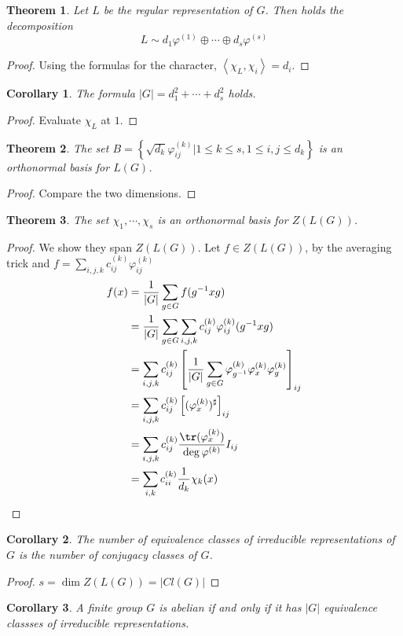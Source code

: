 \documentclass{article}
\newtheorem{Thm}{Theorem}[section]
\newtheorem{corollary}{Corollary}[Thm]
\theoremstyle{definition}
\begin{document}
\begin{Thm}
    Let $L$ be the regular representation of $G$. Then holds the decomposition
    \[L\sim d_1\varphi^{(1)}\oplus\cdots\oplus d_s\varphi^{(s)}\]
\end{Thm}
\begin{proof}
    Using the formulas for the character, $\left\langle\chi_L,\chi_i\right\rangle=d_i$.
\end{proof}
\begin{corollary}
    The formula $\left|G\right|=d_1^2+\cdots+d_s^2$ holds.
\end{corollary}
\begin{proof}
    Evaluate $\chi_L$ at $1$.
\end{proof}

\begin{Thm}
    The set $B=\left\{\sqrt{d_k}\varphi_{ij}^{(k)}|1\le k\le s,1\le i,j\le d_k\right\}$ is an orthonormal basis for $L(G)$.
\end{Thm}
\begin{proof}
    Compare the two dimensions.
\end{proof}

\begin{Thm}
    The set $\chi_1,\cdots,\chi_s$ is an orthonormal basis for $Z(L(G))$.
\end{Thm}
\begin{proof}
    We show they span $Z(L(G))$. Let $f\in Z(L(G))$, by the averaging trick and $f=\sum_{i,j,k}c_{ij}^{(k)}\varphi_{ij}^{(k)}$
    \begin{align*}
        f(x)&=\frac{1}{\left|G\right|}\sum_{g\in G}f(g^{-1}xg)\\
        &=\frac{1}{\left|G\right|}\sum_{g\in G}\sum_{i,j,k}c_{ij}^{(k)}\varphi_{ij}^{(k)}(g^{-1}xg)\\
        &=\sum_{i,j,k}c_{ij}^{(k)}\left[\frac{1}{\left|G\right|}\sum_{g\in G}\varphi^{(k)}_{g^{-1}}\varphi^{(k)}_x\varphi^{(k)}_g\right]_{ij}\\
        &=\sum_{i,j,k}c_{ij}^{(k)}\left[(\varphi_x^{(k)})^\sharp\right]_{ij}\\
        &=\sum_{i,j,k}c_{ij}^{(k)}\frac{\tr(\varphi_x^{(k)})}{\deg \varphi^{(k)}}I_{ij}\\
        &=\sum_{i,k}c_{ii}^{(k)}\frac{1}{d_k}\chi_k(x)
    \end{align*}
\end{proof}
\begin{corollary}
    The number of equivalence classes of irreducible representations of $G$ is the number of conjugacy classes of $G$.
\end{corollary}
\begin{proof}
    $s=\dim Z(L(G))=\left|Cl(G)\right|$
\end{proof}
\begin{corollary}
    A finite group $G$ is abelian if and only if it has $\left|G\right|$ equivalence classses of irreducible representations.
\end{corollary}
\end{document}
